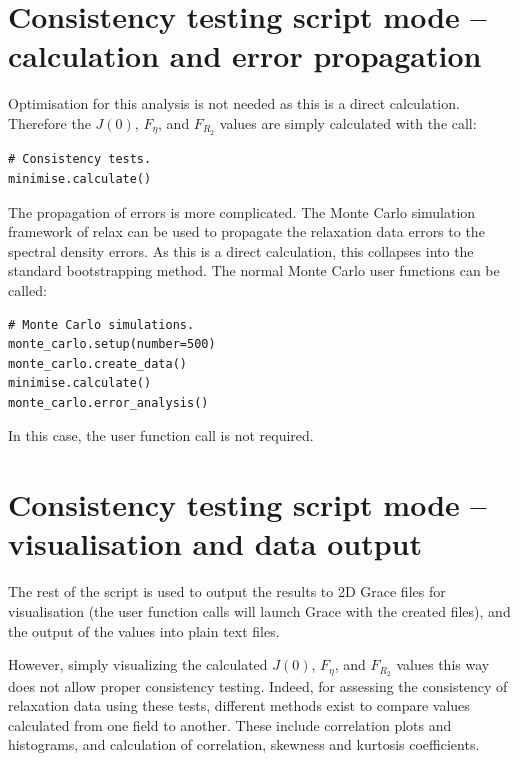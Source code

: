 
\section{Consistency testing script mode -- calculation and error propagation}

Optimisation for this analysis is not needed as this is a direct calculation.
Therefore the $J(0)$, $F_\eta$, and $F_{R_2}$ values are simply calculated with the call:

\begin{lstlisting}[firstnumber=65]
# Consistency tests.
minimise.calculate()
\end{lstlisting}

The propagation of errors is more complicated.
The Monte Carlo simulation framework of relax can be used to propagate the relaxation data errors to the spectral density errors.
As this is a direct calculation, this collapses into the standard bootstrapping method.
The normal Monte Carlo user functions can be called:

\begin{lstlisting}[firstnumber=68]
# Monte Carlo simulations.
monte_carlo.setup(number=500)
monte_carlo.create_data()
minimise.calculate()
monte_carlo.error_analysis()
\end{lstlisting}

In this case, the  user function call is not required.



\section{Consistency testing script mode -- visualisation and data output}
\label{sec: Visualisation and data output}

The rest of the script is used to output the results to 2D Grace files for visualisation (the  user function calls will launch Grace with the created files), and the output of the values into plain text files.

However, simply visualizing the calculated $J(0)$, $F_\eta$, and $F_{R_2}$ values this way does not allow proper consistency testing.
Indeed, for assessing the consistency of relaxation data using these tests, different methods exist to compare values calculated from one field to another.
These include correlation plots and histograms, and calculation of correlation, skewness and kurtosis coefficients.

